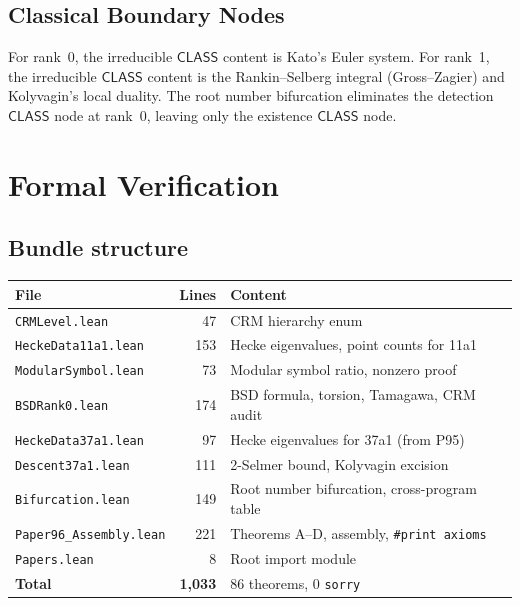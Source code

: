 \documentclass[11pt]{article}
\theoremstyle{plain}
\theoremstyle{definition}
\theoremstyle{remark}
\newcommand{\CLASS}{\ensuremath{\mathsf{CLASS}}}
\begin{document}
\subsection{Classical Boundary Nodes}

For rank~0, the irreducible $\CLASS$ content is Kato's Euler system. For rank~1, the irreducible $\CLASS$ content is the Rankin--Selberg integral (Gross--Zagier) and Kolyvagin's local duality. The root number bifurcation eliminates the detection $\CLASS$ node at rank~0, leaving only the existence $\CLASS$ node.


\section{Formal Verification}
\label{sec:lean}

\subsection{Bundle structure}

\begin{center}
\begin{tabular}{lrl}
\toprule
\textbf{File} & \textbf{Lines} & \textbf{Content} \\
\midrule
\texttt{CRMLevel.lean} & 47 & CRM hierarchy enum \\
\texttt{HeckeData11a1.lean} & 153 & Hecke eigenvalues, point counts for 11a1 \\
\texttt{ModularSymbol.lean} & 73 & Modular symbol ratio, nonzero proof \\
\texttt{BSDRank0.lean} & 174 & BSD formula, torsion, Tamagawa, CRM audit \\
\texttt{HeckeData37a1.lean} & 97 & Hecke eigenvalues for 37a1 (from P95) \\
\texttt{Descent37a1.lean} & 111 & 2-Selmer bound, Kolyvagin excision \\
\texttt{Bifurcation.lean} & 149 & Root number bifurcation, cross-program table \\
\texttt{Paper96\_Assembly.lean} & 221 & Theorems A--D, assembly, \texttt{\#print axioms} \\
\texttt{Papers.lean} & 8 & Root import module \\
\midrule
\textbf{Total} & \textbf{1{,}033} & 86 theorems, 0 \texttt{sorry} \\
\bottomrule
\end{tabular}
\end{center}
\end{document}
